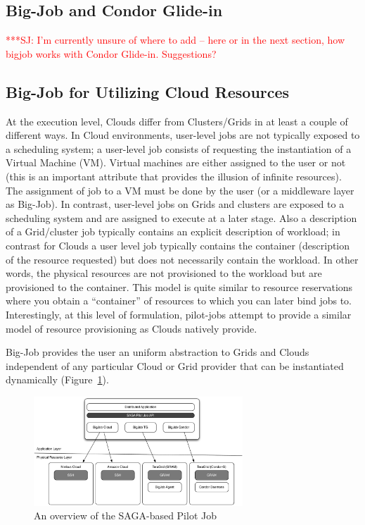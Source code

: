 \documentclass[conference,final]{IEEEtran}
\newcommand{\jhanote}[1]{ {\textcolor{red} { ***SJ: #1 }}}
\newcommand{\jhanote}[1]{}
\begin{document}
\subsection{Big-Job and Condor Glide-in}

\jhanote{I'm currently unsure of where to add -- here or in the next
  section, how bigjob works with Condor Glide-in. Suggestions?}

\subsection{Big-Job for Utilizing Cloud Resources}


At the execution level, Clouds differ from Clusters/Grids in at least
a couple of different ways. In Cloud environments, user-level jobs are
not typically exposed to a scheduling system; a user-level job
consists of requesting the instantiation of a Virtual Machine (VM).
Virtual machines are either assigned to the user or not (this is an
important attribute that provides the illusion of infinite resources).
The assignment of job to a VM must be done by the user (or a
middleware layer as Big-Job).  In contrast, user-level jobs on Grids
and clusters are exposed to a scheduling system and are assigned to
execute at a later stage.  Also a description of a Grid/cluster job
typically contains an explicit description of workload; in contrast
for Clouds a user level job typically contains the container
(description of the resource requested) but does not necessarily
contain the workload. In other words, the physical resources are
not provisioned to the workload but are provisioned to the container.
This model is quite similar to resource reservations where you obtain
a ``container'' of resources to which you can later bind jobs
to. Interestingly, at this level of formulation, pilot-jobs attempt to
provide a similar model of resource provisioning as Clouds natively
provide.

Big-Job provides the user an uniform abstraction to Grids and Clouds
independent of any particular Cloud or Grid provider that can be
instantiated dynamically
(Figure~\ref{fig:figures_distributed_pilot_job}).

\begin{figure}[htbp]
    \centering
        \includegraphics[width=0.7\textwidth]{figures/distributed_pilot_job.pdf}
    \caption{An overview of the SAGA-based Pilot Job}
    \label{fig:figures_distributed_pilot_job}
\end{figure}
\end{document}
